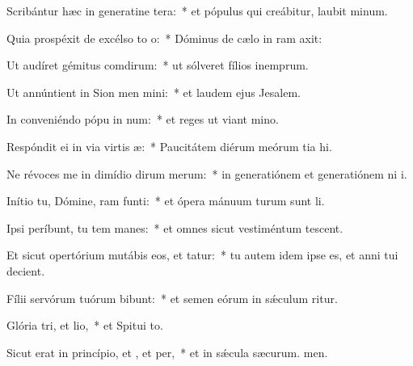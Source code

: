 \item Scribántur hæc in generatine tera:~* et pópulus qui creábitur, laubit minum.
\item Quia prospéxit de excélso to o:~* Dóminus de cælo in ram axit:
\item Ut audíret gémitus comdirum:~* ut sólveret fílios inemprum.
\item Ut annúntient in Sion men mini:~* et laudem ejus  Jesalem.
\item In conveniéndo pópu in num:~* et reges ut viant mino.
\item Respóndit ei in via virtis æ:~* Paucitátem diérum meórum tia hi.
\item Ne révoces me in dimídio dirum merum:~* in generatiónem et generatiónem ni i.
\item Inítio tu, Dómine, ram funti:~* et ópera mánuum turum sunt li.
\item Ipsi períbunt, tu tem manes:~* et omnes sicut vestiméntum tescent.
\item Et sicut opertórium mutábis eos, et tatur:~* tu autem idem ipse es, et anni tui  decient.
\item Fílii servórum tuórum bibunt:~* et semen eórum in sǽculum ritur.
\item Glória tri, et lio,~* et Spitui to.
\item Sicut erat in princípio, et , et per,~* et in sǽcula sæcurum. men.
